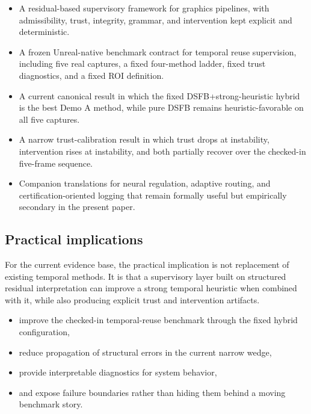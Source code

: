 \documentclass[11pt]{article}
\theoremstyle{definition}
\theoremstyle{plain}
\begin{document}
\begin{itemize}[leftmargin=1.5em]
    \item A residual-based supervisory framework for graphics pipelines, with admissibility, trust, integrity, grammar, and intervention kept explicit and deterministic.
    \item A frozen Unreal-native benchmark contract for temporal reuse supervision, including five real captures, a fixed four-method ladder, fixed trust diagnostics, and a fixed ROI definition.
    \item A current canonical result in which the fixed DSFB+strong-heuristic hybrid is the best Demo A method, while pure DSFB remains heuristic-favorable on all five captures.
    \item A narrow trust-calibration result in which trust drops at instability, intervention rises at instability, and both partially recover over the checked-in five-frame sequence.
    \item Companion translations for neural regulation, adaptive routing, and certification-oriented logging that remain formally useful but empirically secondary in the present paper.
\end{itemize}


\subsection{Practical implications}

For the current evidence base, the practical implication is not replacement of existing temporal methods. It is that a supervisory layer built on structured residual interpretation can improve a strong temporal heuristic when combined with it, while also producing explicit trust and intervention artifacts.

\begin{itemize}[leftmargin=1.5em]
    \item improve the checked-in temporal-reuse benchmark through the fixed hybrid configuration,
    \item reduce propagation of structural errors in the current narrow wedge,
    \item provide interpretable diagnostics for system behavior,
    \item and expose failure boundaries rather than hiding them behind a moving benchmark story.
\end{itemize}
\end{document}
